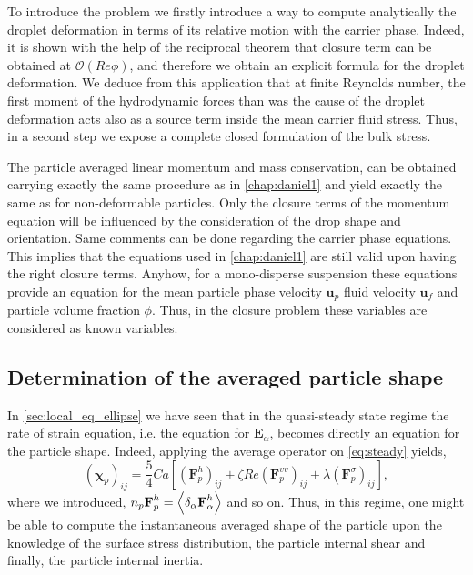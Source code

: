To introduce the problem we firstly introduce a way to compute analytically the droplet deformation in terms of its relative motion with the carrier phase. 
Indeed, it is shown with the help of the reciprocal theorem that closure term can be obtained at $\mathcal{O}(Re \phi)$, and therefore we obtain an explicit formula for the droplet deformation. 
We deduce from this application that at finite Reynolds number, the first moment of the hydrodynamic forces than was the cause of the droplet deformation acts also as a source term inside the mean carrier fluid stress. 
Thus, in a second step we expose a complete closed formulation of the bulk stress. 


The particle averaged linear momentum and mass conservation, can be obtained carrying exactly the same procedure as in \ref{chap:daniel1} and yield exactly the same as for non-deformable particles. 
Only the closure terms of the momentum equation will be influenced by the consideration of the drop shape and orientation.
Same comments can be done regarding the carrier phase equations. 
This implies that the equations used in \ref{chap:daniel1} are still valid upon having the right closure terms. 
Anyhow, for a mono-disperse suspension these equations provide an equation for the mean particle phase velocity $\textbf{u}_p$ fluid velocity $\textbf{u}_f$ and particle volume fraction $\phi$. 
Thus, in the closure problem these variables are considered as known variables. 

\subsection{Determination of the averaged particle shape}

In \ref{sec:local_eq_ellipse} we have seen that in the quasi-steady state regime the rate of strain equation, i.e. the equation for $\textbf{E}_\alpha$, becomes directly an equation for the particle shape. 
Indeed, applying the average operator on \ref{eq:steady} yields,
\begin{equation}
    (\bm\chi_{p})_{ij}
    = 
    \frac{5}{4}Ca \left[
        (\textbf{F}_p^h )_{ij}
        + \zeta Re (\textbf{F}_p^{vv})_{ij}
        +    \lambda (\textbf{F}_p^{\sigma})_{ij}
    \right],
    \label{eq:steady_state_avg}
\end{equation}
where we introduced, $n_p \textbf{F}_p^h = \left<\delta_\alpha \textbf{F}_\alpha^h\right>$ and so on. 
Thus, in this regime, one might be able to compute the instantaneous averaged shape of the particle upon the knowledge of the surface stress distribution, the particle internal shear and finally, the particle internal inertia. 

